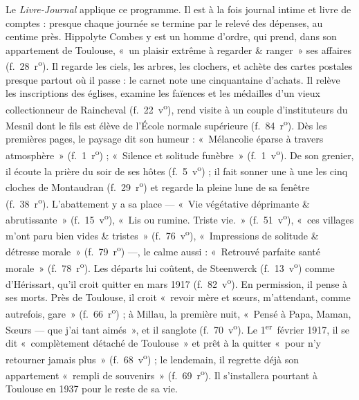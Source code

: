 Le \textit{Livre-Journal} applique ce programme. Il est à la fois journal intime et livre de comptes : presque chaque journée se termine par le relevé des dépenses, au centime près. Hippolyte Combes y est un homme d'ordre, qui prend, dans son appartement de Toulouse, «~un plaisir extrême à regarder \& ranger~» ses affaires (f.~28~r\textsuperscript{o}). Il regarde les ciels, les arbres, les clochers, et achète des cartes postales presque partout où il passe : le carnet note une cinquantaine d'achats. Il relève les inscriptions des églises, examine les faïences et les médailles d'un vieux collectionneur de Raincheval (f.~22~v\textsuperscript{o}), rend visite à un couple d'instituteurs du Mesnil dont le fils est élève de l'École normale supérieure (f.~84~r\textsuperscript{o}). Dès les premières pages, le paysage dit son humeur : «~Mélancolie éparse à travers atmosphère~» (f.~1~r\textsuperscript{o}) ; «~Silence et solitude funèbre~» (f.~1~v\textsuperscript{o}). De son grenier, il écoute la prière du soir de ses hôtes (f.~5~v\textsuperscript{o}) ; il fait sonner une à une les cinq cloches de Montaudran (f.~29~r\textsuperscript{o}) et regarde la pleine lune de sa fenêtre (f.~38~r\textsuperscript{o}). L'abattement y a sa place --- «~Vie végétative déprimante \& abrutissante~» (f.~15~v\textsuperscript{o}), «~Lis ou rumine. Triste vie.~» (f.~51~v\textsuperscript{o}), «~ces villages m'ont paru bien vides \& tristes~» (f.~76~v\textsuperscript{o}), «~Impressions de solitude \& détresse morale~» (f.~79~r\textsuperscript{o}) ---, le calme aussi : «~Retrouvé parfaite santé morale~» (f.~78~r\textsuperscript{o}). Les départs lui coûtent, de Steenwerck (f.~13~v\textsuperscript{o}) comme d'Hérissart, qu'il croit quitter en mars 1917 (f.~82~v\textsuperscript{o}). En permission, il pense à ses morts. Près de Toulouse, il croit «~revoir mère et sœurs, m'attendant, comme autrefois, gare~» (f.~66~r\textsuperscript{o}) ; à Millau, la première nuit, «~Pensé à Papa, Maman, Sœurs --- que j'ai tant aimés~», et il sanglote (f.~70~v\textsuperscript{o}). Le 1\textsuperscript{er}~février 1917, il se dit «~complètement détaché de Toulouse~» et prêt à la quitter «~pour n'y retourner jamais plus~» (f.~68~v\textsuperscript{o}) ; le lendemain, il regrette déjà son appartement «~rempli de souvenirs~» (f.~69~r\textsuperscript{o}). Il s'installera pourtant à Toulouse en 1937 pour le reste de sa vie.


